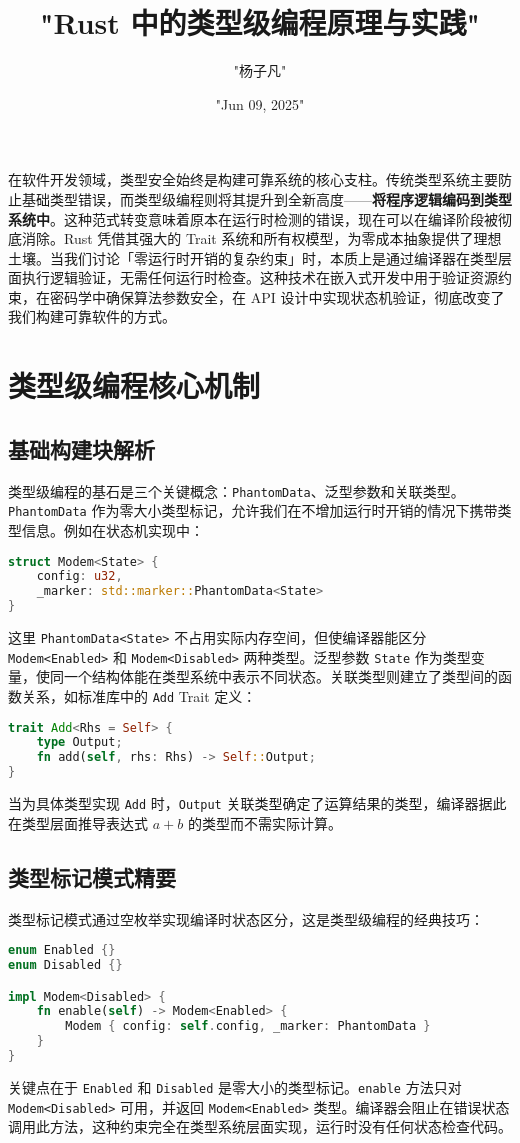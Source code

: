 \title{"Rust 中的类型级编程原理与实践"}
\author{"杨子凡"}
\date{"Jun 09, 2025"}
\maketitle
在软件开发领域，类型安全始终是构建可靠系统的核心支柱。传统类型系统主要防止基础类型错误，而类型级编程则将其提升到全新高度——\textbf{将程序逻辑编码到类型系统中}。这种范式转变意味着原本在运行时检测的错误，现在可以在编译阶段被彻底消除。Rust 凭借其强大的 Trait 系统和所有权模型，为零成本抽象提供了理想土壤。当我们讨论「零运行时开销的复杂约束」时，本质上是通过编译器在类型层面执行逻辑验证，无需任何运行时检查。这种技术在嵌入式开发中用于验证资源约束，在密码学中确保算法参数安全，在 API 设计中实现状态机验证，彻底改变了我们构建可靠软件的方式。\par
\chapter{类型级编程核心机制}
\section{基础构建块解析}
类型级编程的基石是三个关键概念：\texttt{PhantomData}、泛型参数和关联类型。\texttt{PhantomData} 作为零大小类型标记，允许我们在不增加运行时开销的情况下携带类型信息。例如在状态机实现中：\par
\begin{lstlisting}[language=rust]
struct Modem<State> {
    config: u32,
    _marker: std::marker::PhantomData<State>
}
\end{lstlisting}
这里 \texttt{PhantomData<State>} 不占用实际内存空间，但使编译器能区分 \texttt{Modem<Enabled>} 和 \texttt{Modem<Disabled>} 两种类型。泛型参数 \texttt{State} 作为类型变量，使同一个结构体能在类型系统中表示不同状态。关联类型则建立了类型间的函数关系，如标准库中的 \texttt{Add} Trait 定义：\par
\begin{lstlisting}[language=rust]
trait Add<Rhs = Self> {
    type Output;
    fn add(self, rhs: Rhs) -> Self::Output;
}
\end{lstlisting}
当为具体类型实现 \texttt{Add} 时，\texttt{Output} 关联类型确定了运算结果的类型，编译器据此在类型层面推导表达式 $a + b$ 的类型而不需实际计算。\par
\section{类型标记模式精要}
类型标记模式通过空枚举实现编译时状态区分，这是类型级编程的经典技巧：\par
\begin{lstlisting}[language=rust]
enum Enabled {}
enum Disabled {}

impl Modem<Disabled> {
    fn enable(self) -> Modem<Enabled> {
        Modem { config: self.config, _marker: PhantomData }
    }
}
\end{lstlisting}
关键点在于 \texttt{Enabled} 和 \texttt{Disabled} 是零大小的类型标记。\texttt{enable} 方法只对 \texttt{Modem<Disabled>} 可用，并返回 \texttt{Modem<Enabled>} 类型。编译器会阻止在错误状态调用此方法，这种约束完全在类型系统层面实现，运行时没有任何状态检查代码。\par
